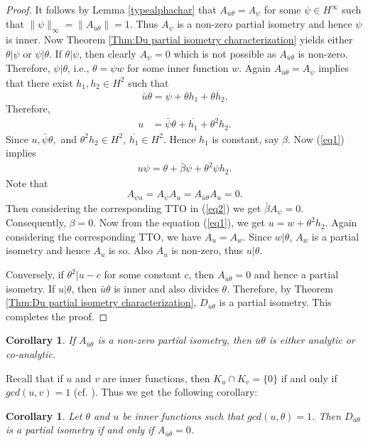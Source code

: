 \documentclass[12pt]{amsart}
\newcommand{\h}{{H}^2}
\theoremstyle{definition}
\theoremstyle{plain}
\newtheorem{cor}[thm]{Corollary}
\theoremstyle{definition}
\numberwithin{equation}{section}
\begin{document}
\begin{proof}
It follows by Lemma \ref{typealphachar} that $A_{\bar{u}\theta}=A_\psi$ for some $\psi \in H^\infty$ such that $\|\psi\|_\infty=\|A_{\bar{u}\theta}\|=1$. Thus $A_{\psi}$ is a non-zero partial isometry and hence $\psi$ is inner. Now Theorem \ref{Thm:Du partial isometry characterization} yields either $\theta | \psi$ or $\psi | \theta$. If $\theta | \psi$, then clearly $A_\psi=0$ which is not possible as $A_{\bar{u}\theta}$ is non-zero. Therefore, $\psi | \theta$, i.e., $\theta=\psi w$ for some inner function $w$.
Again $A_{\bar{u}\theta}=A_\psi$ implies that there exist $h_1, h_2 \in \h$ such that
\[
\bar{u}\theta =\psi +\theta h_1 +\overline{\theta h_2}.
\]
Therefore,
\begin{align} \label{eq1}
u &= \bar{\psi}\theta +\overline{h_1} +\theta^2 h_2.
\end{align}
Since $u, \bar{\psi}\theta,$ and $\theta ^2 h_2 \in \h$, $\overline{h_1} \in \h$. 
Hence $h_1$ is constant, say $\beta$. Now (\ref{eq1}) implies 
\begin{align}\label{eq2}
u\psi=\theta + \bar{\beta} \psi +\theta^2 \psi h_2.
\end{align}
Note that 
\[
A_{\psi u}=A_\psi A_u=A_{\bar{u}\theta}A_u=0. 
\]
Then considering the corresponding TTO in (\ref{eq2}) we get $\bar{\beta} A_\psi=0$. Consequently, $\beta=0$. Now from the equation (\ref{eq1}), we get $u=w +\theta^2 h_2$. Again considering the corresponding TTO, we have $A_u=A_w$. Since $w | \theta$, $A_w$ is a partial isometry and hence $A_u$ is so. Also $A_u$ is non-zero, thus $u | \theta$.

Conversely, if $\theta^2|u-c$ for some constant $c$, then $A_{\bar{u}\theta}=0$ and hence a partial isometry. If $u|\theta$, then $\bar{u}\theta$ is inner and also divides 
$\theta$. Therefore, by Theorem \ref{Thm:Du partial isometry characterization},  $D_{\bar{u}\theta}$ is a partial isometry.
This completes the proof.		
\end{proof}
	
	
\begin{cor}
If $A_{\bar{u}\theta}$ is a non-zero partial isometry, then $\bar{u}\theta$ is either analytic or co-analytic.
\end{cor}
	

Recall that if $u$ and $v$ are inner functions, then $K_{u}\cap K_{v}=\{0\}$ if and only if $gcd(u,v)=1$ (cf. \cite{GM}). Thus we get the following corollary:
	
\begin{cor}
Let $\theta$ and $u$ be inner functions such that $gcd(u,\theta)=1$. Then $D_{\bar{u}\theta}$ is a partial isometry if and only if $A_{\bar{u}\theta} = 0$.
\end{cor}
\end{document}
